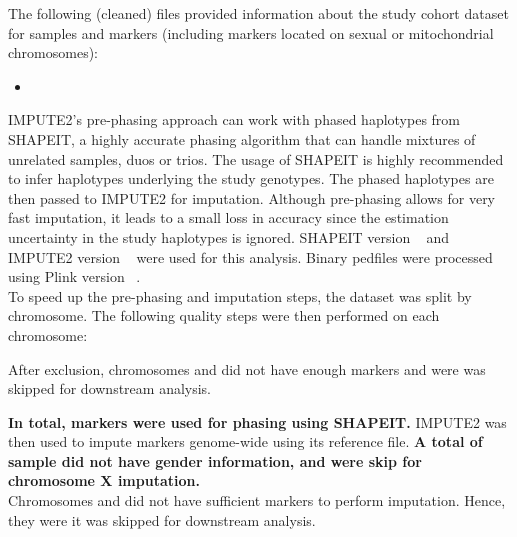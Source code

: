 
The following (cleaned) files provided information about the study cohort
dataset for  samples and 
markers (including  markers located on sexual or
mitochondrial chromosomes):

\begin{itemize}
  \item {}
\end{itemize}

IMPUTE2's pre-phasing approach can work with phased haplotypes from SHAPEIT, a
highly accurate phasing algorithm that can handle mixtures of unrelated
samples, duos or trios. The usage of SHAPEIT is highly recommended to infer
haplotypes underlying the study genotypes. The phased haplotypes are then
passed to IMPUTE2 for imputation. Although pre-phasing allows for very fast
imputation, it leads to a small loss in accuracy since the estimation
uncertainty in the study haplotypes is ignored. SHAPEIT version
~\cite{Delaneau13_23269371} and IMPUTE2 version
~\cite{Howie09_19543373,Howie11_22384356,Howie12_22820512}
were used for this analysis. Binary pedfiles were processed using Plink version
~\cite{Purcell07_17701901}.\\

To speed up the pre-phasing and imputation steps, the dataset was split by
chromosome. The following quality steps were then performed on each chromosome:


After exclusion, chromosomes
 and  did not have enough markers and
were was 
skipped for downstream analysis.\\

\textbf{In total,  markers were used for phasing
using SHAPEIT.} IMPUTE2 was then used to impute markers genome-wide using its
reference file. \textbf{A
total of 
sample did not have gender
information, and were skip for chromosome X
imputation.}\\

Chromosomes
 and  did not have sufficient
markers to perform imputation. Hence,
they were it was 
skipped for downstream analysis.\\

